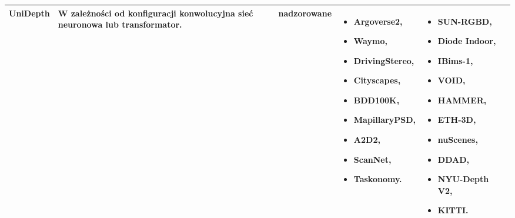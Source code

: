 \begin{table}[H]
{\begin{tabular}{ |l|p{2cm}|p{2cm}|p{5cm}|p{5cm}|r| }
        \hline
        UniDepth &
        W zależności od konfiguracji konwolucyjna sieć neuronowa lub transformator. &
        nadzorowane &
        \begin{itemize}
        \item Argoverse2,
        \item Waymo,
        \item DrivingStereo,
        \item Cityscapes,
        \item BDD100K,
        \item MapillaryPSD,
        \item A2D2,
        \item ScanNet,
        \item Taskonomy.
        \end{itemize} & 
        \begin{itemize} 
            \item SUN-RGBD,
            \item Diode Indoor,
            \item IBims-1,
            \item VOID,
            \item HAMMER,
            \item ETH-3D,
            \item nuScenes,
            \item DDAD,
            \item NYU-Depth V2,
            \item KITTI.
        \end{itemize}\\
        \hline
        \end{tabular}%
    }
    \label{tabela_podsumowanie_algorytmy}
\end{table}

